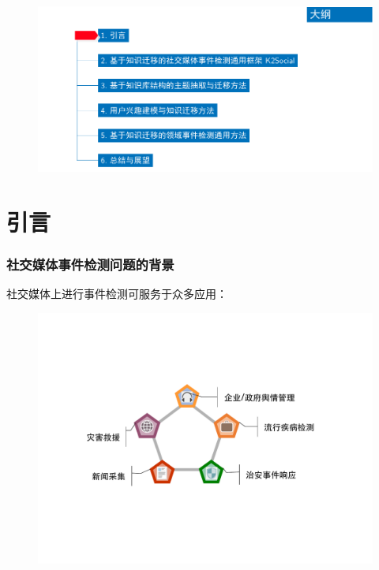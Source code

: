 \begin{withoutheadline}
\begin{frame}
\vspace*{-13mm}
\begin{figure}
	\hspace*{-4.2mm}
    \includegraphics[width=1.0\paperwidth]{img/contents1_output.pdf}
\end{figure}
\end{frame}
\end{withoutheadline}

\section{引言}
%
%


\begin{frame}
\frametitle{\noindent 社交媒体事件检测问题的背景}
社交媒体上进行事件检测可服务于众多应用：
\begin{figure}
    \includegraphics[width=0.75\paperwidth]{img/event_applications.pdf}
\end{figure}

\end{frame}

